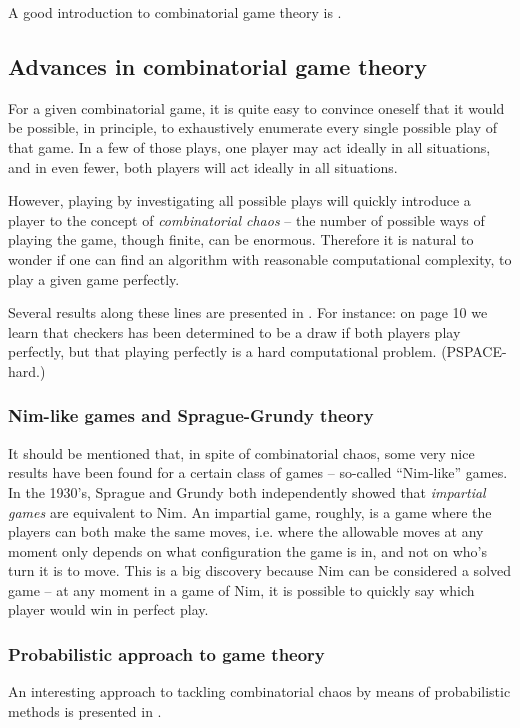 A good introduction to combinatorial game theory is \citep{winning_ways}.

\subsection{Advances in combinatorial game theory}

For a given combinatorial game, it is quite easy to convince oneself that it would be possible, in principle, to exhaustively enumerate every single possible play of that game.
In a few of those plays, one player may act ideally in all situations, and in even fewer, both players will act ideally in all situations.

However, playing by investigating all possible plays will quickly introduce a player to the concept of \emph{combinatorial chaos} -- the number of possible ways of playing the game, though finite, can be enormous.
Therefore it is natural to wonder if one can find an algorithm with reasonable computational complexity, to play a given game perfectly.

Several results along these lines are presented in \citep{demaine_hearn08}. For instance: on page 10 we learn that checkers has been determined to be a draw if both players play perfectly, but that playing perfectly is a hard computational problem. (PSPACE-hard.)

\subsubsection{Nim-like games and Sprague-Grundy theory}

It should be mentioned that, in spite of combinatorial chaos, some very nice results have been found for a certain class of games -- so-called ``Nim-like'' games.
In the 1930's, Sprague and Grundy both independently showed that \emph{impartial games} are equivalent to Nim.
An impartial game, roughly, is a game where the players can both make the same moves, i.e. where the allowable moves at any moment only depends on what configuration the game is in, and not on who's turn it is to move.
This is a big discovery because Nim can be considered a solved game -- at any moment in a game of Nim, it is possible to quickly say which player would win in perfect play.

\subsubsection{Probabilistic approach to game theory}

An interesting approach to tackling combinatorial chaos by means of probabilistic methods is presented in \citep{beck08}.
